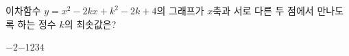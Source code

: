 이차함수 $y=x^2-2kx+k^2-2k+4$의 그래프가 $x$축과 서로 다른 두 점에서 만나도록 하는 정수 $k$의 최솟값은?
\begin{choices32}{$-2$}{$-1$}{$2$}{$3$}{$4$}\end{choices32}
